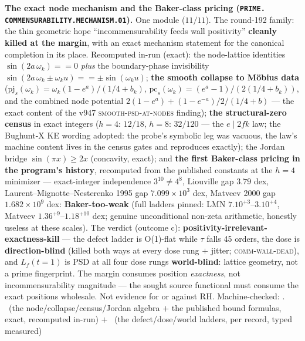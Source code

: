 \par\smallskip\noindent\textbf{The exact node mechanism and the
Baker-class pricing (\texttt{PRIME.\allowbreak
COMMENSURABILITY.\allowbreak MECHANISM.01}).}
One module ($11/11$).  The round-192 family: the thin geometric
hope ``incommensurability feeds wall positivity'' \textbf{cleanly
killed at the margin}, with an exact mechanism statement for the
canonical completion in its place.  Recomputed in-run (exact): the
node-lattice identities $\sin(2a\,\omega_k) == 0$ \emph{plus} the
boundary-phase invisibility $\sin(2a\,\omega_k \pm \omega_k u) ==
\pm\sin(\omega_k u)$; \textbf{the smooth collapse to M\"obius
data} ($\mathrm{pj}_s(\omega_k) = \omega_k(1 - e^a)/(1/4 + b_k)$,
$\mathrm{pc}_s(\omega_k) = (e^a - 1)/(2(1/4 + b_k))$, and the
combined node potential $2(1 - e^a) + (1 - e^{-a})/2/(1/4 + b)$
--- the exact content of the v947 \textsc{smooth-psd-at-nodes}
finding); \textbf{the structural-zero census} in exact integers
($h = 4$: $12/18$, $h = 8$: $32/120$ --- the $e \mid 2fk$ law;
the Bughunt-X KE wording adopted: the probe's symbolic leg was
vacuous, the law's machine content lives in the census gates and
reproduces exactly); the Jordan bridge $\sin(\pi x) \ge 2x$
(concavity, exact); and \textbf{the first Baker-class pricing in
the program's history}, recomputed from the published constants
at the $h = 4$ minimizer --- exact-integer independence $3^{10}
\ne 4^8$, Liouville gap $3.79$ dex, Laurent--Mignotte--Nesterenko
1995 gap $7.099\times10^3$ dex, Matveev 2000 gap
$1.682\times10^9$ dex: \textbf{Baker-too-weak} (full ladders
pinned: LMN $7.10^{+3}$--$3.10^{+4}$, Matveev
$1.36^{+9}$--$1.18^{+10}$ dex; genuine unconditional non-zeta
arithmetic, honestly useless at these scales).  The verdict
(outcome c): \textbf{positivity-irrelevant-exactness-kill} ---
the defect ladder is O(1)-flat while $\tau$ falls 45 orders, the
dose is \textbf{direction-blind} (killed both ways at every dose
rung $+$ jitter; \textsc{comm-wall-dead}), and $L_f(t = 1)$ is
PSD at all four dose rungs \textbf{world-blind}: lattice
geometry, not a prime fingerprint.  The margin consumes position
\emph{exactness}, not incommensurability magnitude --- the sought
source functional must consume the exact positions wholesale.
Not evidence for or against RH.
Machine-checked: .
\mE\ (the node/collapse/census/Jordan algebra $+$ the published
bound formulas, exact, recomputed in-run) $+$ \mC\ (the
defect/dose/world ladders, per record, typed measured)
\par\smallskip


